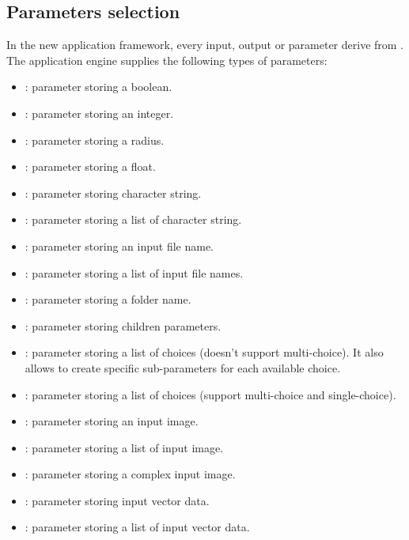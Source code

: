 \subsection{Parameters selection}
\label{sec:appParam}
In the new application framework, every input, output or parameter derive from 
. The application engine supplies the following 
types of parameters:
\begin{itemize}
  \item {} : parameter storing a boolean. 
  \item {} : parameter storing an integer.
  \item {} : parameter storing a radius.
  \item {} : parameter storing a float.
  \item {} : parameter storing character string.
  \item {} : parameter storing a list of character string.
  \item {} : parameter storing an input file name.
  \item {} : parameter storing a list of input file names.
  \item {} : parameter storing a folder name.
  \item {} : parameter storing children parameters.
  \item {} : parameter storing a list of choices (doesn't support
  multi-choice). It also allows to create specific sub-parameters for each available choice.
  \item {} : parameter storing a list of choices (support 
  multi-choice and single-choice).
  \item {} : parameter storing an input image.
  \item {} : parameter storing a list of input image.
  \item {} : parameter storing a complex input image.
  \item {} : parameter storing input vector data.
  \item {} : parameter storing a list of input vector data.

\end{itemize}
